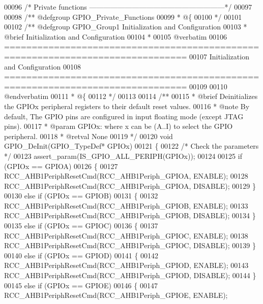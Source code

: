 \begin{DoxyCode}
00096 \textcolor{comment}{/* Private functions ---------------------------------------------------------*/}
00097 
00098 \textcolor{comment}{/** @defgroup GPIO\_Private\_Functions}
00099 \textcolor{comment}{  * @\{}
00100 \textcolor{comment}{  */}
00101 
00102 \textcolor{comment}{/** @defgroup GPIO\_Group1 Initialization and Configuration}
00103 \textcolor{comment}{ *  @brief   Initialization and Configuration}
00104 \textcolor{comment}{ *}
00105 \textcolor{comment}{@verbatim   }
00106 \textcolor{comment}{ ===============================================================================}
00107 \textcolor{comment}{                        Initialization and Configuration}
00108 \textcolor{comment}{ ===============================================================================  }
00109 \textcolor{comment}{}
00110 \textcolor{comment}{@endverbatim}
00111 \textcolor{comment}{  * @\{}
00112 \textcolor{comment}{  */}
00113 
00114 \textcolor{comment}{/**}
00115 \textcolor{comment}{  * @brief  Deinitializes the GPIOx peripheral registers to their default reset values.}
00116 \textcolor{comment}{  * @note   By default, The GPIO pins are configured in input floating mode (except JTAG pins).}
00117 \textcolor{comment}{  * @param  GPIOx: where x can be (A..I) to select the GPIO peripheral.}
00118 \textcolor{comment}{  * @retval None}
00119 \textcolor{comment}{  */}
00120 \textcolor{keywordtype}{void} GPIO_DeInit(GPIO\_TypeDef* GPIOx)
00121 \{
00122   \textcolor{comment}{/* Check the parameters */}
00123   assert_param(IS\_GPIO\_ALL\_PERIPH(GPIOx));
00124 
00125   \textcolor{keywordflow}{if} (GPIOx == GPIOA)
00126   \{
00127     RCC_AHB1PeriphResetCmd(RCC_AHB1Periph_GPIOA, ENABLE);
00128     RCC_AHB1PeriphResetCmd(RCC_AHB1Periph_GPIOA, DISABLE);
00129   \}
00130   \textcolor{keywordflow}{else} \textcolor{keywordflow}{if} (GPIOx == GPIOB)
00131   \{
00132     RCC_AHB1PeriphResetCmd(RCC_AHB1Periph_GPIOB, ENABLE);
00133     RCC_AHB1PeriphResetCmd(RCC_AHB1Periph_GPIOB, DISABLE);
00134   \}
00135   \textcolor{keywordflow}{else} \textcolor{keywordflow}{if} (GPIOx == GPIOC)
00136   \{
00137     RCC_AHB1PeriphResetCmd(RCC_AHB1Periph_GPIOC, ENABLE);
00138     RCC_AHB1PeriphResetCmd(RCC_AHB1Periph_GPIOC, DISABLE);
00139   \}
00140   \textcolor{keywordflow}{else} \textcolor{keywordflow}{if} (GPIOx == GPIOD)
00141   \{
00142     RCC_AHB1PeriphResetCmd(RCC_AHB1Periph_GPIOD, ENABLE);
00143     RCC_AHB1PeriphResetCmd(RCC_AHB1Periph_GPIOD, DISABLE);
00144   \}
00145   \textcolor{keywordflow}{else} \textcolor{keywordflow}{if} (GPIOx == GPIOE)
00146   \{
00147     RCC_AHB1PeriphResetCmd(RCC_AHB1Periph_GPIOE, ENABLE);

\end{DoxyCode}
